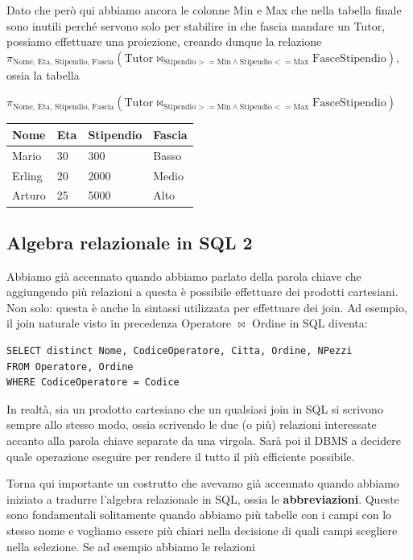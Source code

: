 \documentclass[11pt, a4paper, titlepage, oneside]{scrbook}
\begin{document}
Dato che però qui abbiamo ancora le colonne Min e Max che nella tabella finale sono inutili perché servono solo per stabilire in che fascia mandare un Tutor, possiamo effettuare una proiezione, creando dunque la relazione $\pi_{\text{Nome, Eta, Stipendio, Fascia}}(\text{Tutor} \bowtie_{\text{Stipendio} >= \text{Min} \land \text{Stipendio} <= \text{Max}} \text{FasceStipendio})$, ossia la tabella

\begin{center}
$\pi_{\text{Nome, Eta, Stipendio, Fascia}}(\text{Tutor} \bowtie_{\text{Stipendio} >= \text{Min} \land \text{Stipendio} <= \text{Max}} \text{FasceStipendio})$ \nopagebreak

\begin{tabular}{|l|l|l|l|}
\hline
\textbf{Nome} & \textbf{Eta} & \textbf{Stipendio} & \textbf{Fascia} \\ \hline
Mario & 30 & 300 & Basso \\
Erling & 20 & 2000 & Medio  \\
Arturo & 25 &  5000 & Alto \\ \hline
\end{tabular}
\end{center}


\subsection{Algebra relazionale in SQL 2}

Abbiamo già accennato quando abbiamo parlato della parola chiave  che aggiungendo più relazioni a questa è possibile effettuare dei prodotti cartesiani. Non solo: questa è anche la sintassi utilizzata per effettuare dei join.
Ad esempio, il join naturale visto in precedenza Operatore $\bowtie$ Ordine in SQL diventa:
\begin{lstlisting}
SELECT distinct Nome, CodiceOperatore, Citta, Ordine, NPezzi
FROM Operatore, Ordine
WHERE CodiceOperatore = Codice
\end{lstlisting}

In realtà, sia un prodotto cartesiano che un qualsiasi join in SQL si scrivono sempre allo stesso modo, ossia scrivendo le due (o più) relazioni interessate accanto alla parola chiave  separate da una virgola. Sarà poi il DBMS a decidere quale operazione eseguire per rendere il tutto il più efficiente possibile. 

Torna qui importante un costrutto che avevamo già accennato quando abbiamo iniziato a tradurre l'algebra relazionale in SQL, ossia le \textbf{abbreviazioni}. Queste sono fondamentali solitamente quando abbiamo più tabelle con i campi con lo stesso nome e vogliamo essere più chiari nella decisione di quali campi scegliere nella selezione. Se ad esempio abbiamo le relazioni
\end{document}
